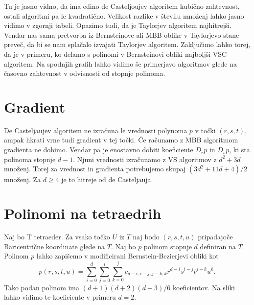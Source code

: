 \documentclass{article}
\begin{document}
Tu je jasno vidno, da ima edino de Casteljoujev algoritem kubično zahtevnost, ostali algoritmi pa le kvadratično. Velikost razlike v številu množenj lahko jasno vidimo v zgornji tabeli. Opazimo tudi, da je Taylorjev algoritem najhitrejši. Vendar nas sama pretvorba iz Bernsteinove ali MBB oblike v Taylorjevo stane preveč, da bi se nam splačalo izvajati Taylorjev algoritem. Zaključimo lahko torej, da je v primeru, ko delamo s polinomi v Bernsteinovi obliki najboljši VSC algoritem.
Na spodnjih grafih lahko vidimo še primerjavo algoritmov glede na časovno zahtevnost v odvisnosti od stopnje polinoma.
\begin{figure}[h]
\centering
\begin{minipage}{.5\textwidth}
\centering
\label{fig:vs}
\end{minipage}%
\begin{minipage}{.5\textwidth}
\centering
\label{fig:vspot}
\end{minipage}
\end{figure}


 \begin{figure}[h]
\centering
\begin{minipage}{.5\textwidth}
\centering
\label{fig:vsc}
\end{minipage}
\end{figure}


 \newpage
\section{Gradient}
De Casteljaujev algoritem ne izračuna le vrednosti polynoma $p$ v točki $(r,s,t)$, ampak hkrati vrne tudi gradient v tej točki. Če računamo z MBB algoritmom gradienta ne dobimo. Vendar pa je enostavno dobiti koeficiente $D_rp$ in $D_sp$, ki sta polinoma stopnje $d-1$. Njuni vrednosti izračunamo z VS algoritmov z $d^2 + 3d$ množenj. Torej za vrednost in gradienta potrebujemo skupaj $(3d^2 + 11d + 4)/2$ množenj. Za $d\geq4$ je to hitreje od de Casteljauja. 


\section{Polinomi na tetraedrih}

Naj bo T tetraeder. Za vsako točko $U$ iz $T$ naj bodo $(r,s,t,u)$ pripadajoče Baricentrične koordinate glede na $T$.  Naj bo $p$ polinom stopnje $d$ definiran na $T$. Polinom $p$ lahko zapišemo v modificirani Bernstein-Bezierjevi obliki kot 
$$p(r,s,t,u) = \sum_{i = 0}^d{\sum_{j=0}^{i}{\sum_{k = 0}^{j}{c_{d-i,i-j,j-k,k} r^{d-i} s^{i-j} t^{j-k} u^k}}}.$$
Tako podan polinom ima $(d+1)(d+2)(d+3)/6$ koeficientov. Na sliki lahko vidimo te koeficiente v primeru $d=2$.
\end{document}
